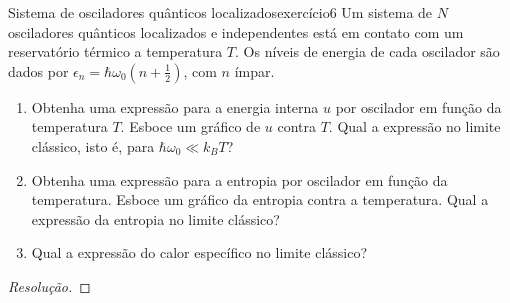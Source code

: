 \begin{exercício}{Sistema de osciladores quânticos localizados}{exercício6}
    Um sistema de \(N\) osciladores quânticos localizados e independentes está em contato com um reservatório térmico a temperatura \(T\). Os níveis de energia de cada oscilador são dados por \(\epsilon_n = \hbar \omega_0 (n + \frac12)\), com \(n\) ímpar.
    \begin{enumerate}[label=(\alph*)]
        \item Obtenha uma expressão para a energia interna \(u\) por oscilador em função da temperatura \(T\). Esboce um gráfico de \(u\) contra \(T\). Qual a expressão no limite clássico, isto é, para \(\hbar \omega_0 \ll k_B T\)?
        \item Obtenha uma expressão para a entropia por oscilador em função da temperatura. Esboce um gráfico da entropia contra a temperatura. Qual a expressão da entropia no limite clássico?
        \item  Qual a expressão do calor específico no limite clássico?
    \end{enumerate}
\end{exercício}
\begin{proof}[Resolução]
\end{proof}
